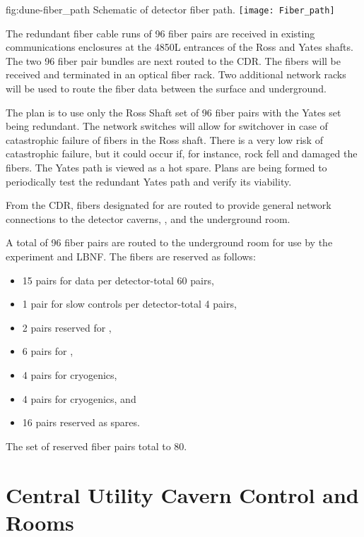 \begin{dunefigure}{fig:dune-fiber_path}
  {Schematic of detector fiber path.}
  \texttt{[image: Fiber\_path]}
\end{dunefigure}

The redundant fiber cable runs of 96 fiber pairs are received in
existing communications enclosures at the 4850L entrances of the Ross
and Yates shafts.  The two 96 fiber pair bundles are next routed to
the CDR.  The fibers will be received and terminated in an optical
fiber rack. Two additional network racks will be used to route the
fiber data between the surface and underground.

The plan is to use only the Ross Shaft set of 96 fiber pairs with the
Yates set being redundant.  The network switches will allow for
switchover in case of catastrophic failure of fibers in the Ross
shaft. %
There is a very low risk of catastrophic failure, but it could occur
if, for instance, rock fell and damaged the fibers.  The Yates path is
viewed as a hot spare. Plans are being formed to periodically test
the redundant Yates path and verify its viability.

From the CDR, fibers designated for  are routed to provide
general network connections to the detector caverns,  , and the underground  room.

A total of 96 fiber pairs are routed to the underground  room for
use by the  experiment and LBNF. The fibers are reserved as
follows:
\begin{itemize}
  \item 15 pairs for  data per detector-total 60 pairs,
\item 1 pair for slow controls per detector-total 4 pairs,
\item 2 pairs reserved for ,
\item 6 pairs for ,
\item 4 pairs for  cryogenics,
\item 4 pairs for  cryogenics, and
  \item 16 pairs reserved as spares.
\end{itemize}
The set of reserved fiber pairs total to 80.



\section{Central Utility Cavern Control and  Rooms}
\label{sec:fdsp-coord-cuc-daq}

